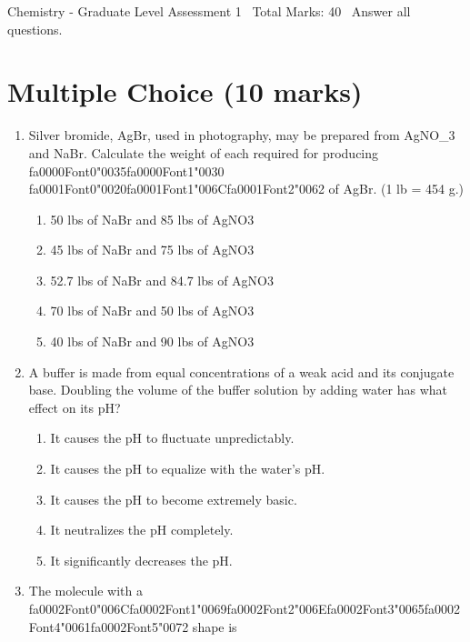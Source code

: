 \documentclass[12pt]{article}
\begin{document}
\begin{center}
Chemistry - Graduate Level Assessment 1 \
Total Marks: 40 \
Answer all questions.
\end{center}

\section*{Multiple Choice (10 marks)}
\begin{enumerate}[label=\arabic*.]
\item Silver bromide, AgBr, used in photography, may be prepared from AgNO\_3 and NaBr. Calculate
the weight of each required for producing {\csname fa0000Font0\endcsname\char"0035}{\csname fa0000Font1\endcsname\char"0030} {\csname fa0001Font0\endcsname\char"0020}{\csname fa0001Font1\endcsname\char"006C}{\csname fa0001Font2\endcsname\char"0062} of AgBr. (1 lb = 454 g.)
\begin{enumerate}[label=(\alph*)]
    \item 50 lbs of NaBr and 85 lbs of AgNO3
    \item 45 lbs of NaBr and 75 lbs of AgNO3
    \item 52.7 lbs of NaBr and 84.7 lbs of AgNO3
    \item 70 lbs of NaBr and 50 lbs of AgNO3
    \item 40 lbs of NaBr and 90 lbs of AgNO3
\end{enumerate}
\item A buffer is made from equal concentrations of a weak acid and its conjugate base. Doubling
the volume of the buffer solution by adding water has what effect on its pH?
\begin{enumerate}[label=(\alph*)]
    \item It causes the pH to fluctuate unpredictably.
    \item It causes the pH to equalize with the water's pH.
    \item It causes the pH to become extremely basic.
    \item It neutralizes the pH completely.
    \item It significantly decreases the pH.
\end{enumerate}
\item The molecule with a {\csname fa0002Font0\endcsname\char"006C}{\csname fa0002Font1\endcsname\char"0069}{\csname fa0002Font2\endcsname\char"006E}{\csname fa0002Font3\endcsname\char"0065}{\csname fa0002Font4\endcsname\char"0061}{\csname fa0002Font5\endcsname\char"0072} shape is
\begin{enumerate}[label=(\alph*)]

\end{enumerate}
\end{enumerate}
\end{document}
